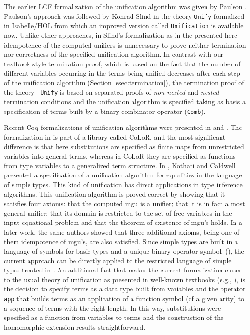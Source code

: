 \documentclass[submission,copyright,creativecommons]{eptcs}
\begin{document}
  The earlier LCF formalization of the unification algorithm was given
  by Paulson \cite{Pa1985}. Paulson's approach was followed by Konrad
  Slind in the theory {\tt Unify} formalized in Isabelle/HOL from
  which an improved version called {\tt Unification} is available
  now. Unlike other approaches, in Slind's formalization as in the
  presented here idempotence of the computed unifiers is unnecessary
  to prove neither termination nor correctness of the specified
  unification algorithm.  In contrast with our textbook style
  termination proof, which is based on the fact that the number of
  different variables occurring in the terms being unified decreases
  after each step of the unification algorithm (Section
  \ref{ssec:termination}), the termination proof of the theory {\tt
    Unify} is based on separated proofs of \emph{non-nested} and
  \emph{nested} termination conditions and the unification algorithm
  is specified taking as basis a specification of terms built by a binary
  combinator operator ({\tt Comb}).

  Recent Coq formalizations of unification algorithms were presented
  in \cite{BlKo2011} and \cite{KoCa2009}. The formalization in
  \cite{BlKo2011} is part of a library called CoLoR, and the most
  significant difference is that here substitutions are specified as
  finite maps from unrestricted variables into general terms, whereas
  in CoLoR they are specified as functions from type variables to a
  generalized term structure.  In \cite{KoCa2009}, Kothari and
  Caldwell presented a specification of a unification algorithm for
  equalities in the language of simple types. This kind of unification
  has direct applications in type inference algorithms. This
  unification algorithm is proved correct by showing that it satisfies
  four axioms: that the computed mgu is a unifier; that it is in fact
  a most general unifier; that its domain is restricted to the set of
  free variables in the input equational problem and that the theorem
  of existence of mgu's holds. In a later work, the same authors
  showed that three additional axioms, being one of them idempotence
  of mgu's, are also satisfied. Since simple types are built in a
  language of symbols for basic types and a unique binary operator
  symbol, (), the current approach can be directly applied to the
  restricted language of simple types treated in \cite{KoCa2009}.  An
  additional fact that makes the current formalization closer to the
  usual theory of unification as presented in well-known textbooks
  (e.g., \cite{Llo87, BaNi98}), is the decision to specify terms as a
  data type built from variables and the operator {\tt app} that
  builds terms as an application of a function symbol (of a given
  arity) to a sequence of terms with the right length. In this way,
  substitutions were specified as a function from variables to terms
  and the construction of the homomorphic extension results
  straightforward.
\end{document}
